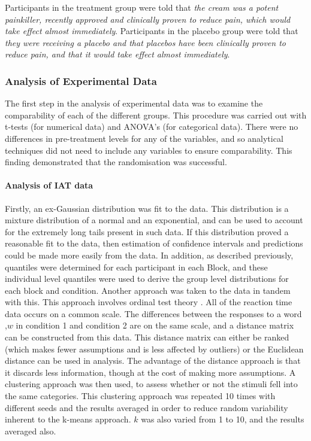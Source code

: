Participants in the treatment group were told that \textit{the cream was a potent painkiller, recently approved and clinically proven to reduce pain, which would take effect almost immediately}. Participants in the placebo group were told that \textit{they were receiving a placebo and that placebos have been clinically proven to reduce pain, and that it would take effect almost immediately}.

\subsubsection{Analysis of Experimental Data}

The first step in the analysis of experimental data was to examine the comparability of each of the different groups. This procedure was carried out with t-tests (for numerical data) and ANOVA's (for categorical data). There were no differences in pre-treatment levels for any of the variables, and so analytical techniques did not need to include any variables to ensure comparability. This finding demonstrated that the randomisation was successful. 

\paragraph{Analysis of IAT data}

Firstly,  an ex-Gaussian distribution was fit to the data. This distribution is a mixture distribution of a normal and an exponential, and can be used to account for the extremely long tails present in such data. If this distribution proved a reasonable fit to the data, then estimation of confidence intervals and predictions could be made more easily from the data.
In addition, as described previously, quantiles were determined for each participant in each Block, and these individual level quantiles were used to derive the group level distributions for each block and condition. 
Another approach was taken to the data in tandem with this. This approach involves ordinal test theory \cite{schulman1975test}. All of the reaction time data occurs on a common scale. The differences between the responses to a word ,$w$ in condition 1 and condition 2 are on the same scale, and a distance matrix can be constructed from this data. This distance matrix can either be ranked (which makes fewer assumptions and is less affected by outliers) or the Euclidean distance can be used in analysis. The advantage of the distance approach is that it discards less information, though at the cost of making more assumptions. A clustering approach was then used, to assess whether or not the stimuli fell into the same categories. This clustering approach was repeated 10 times with different seeds and the results averaged in order to reduce random variability inherent to the k-means approach. $k$ was also varied from 1 to 10, and the results averaged also.

